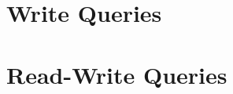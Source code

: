 


\section{Write Queries}
\label{sec:write-queries}




\section{Read-Write Queries}
\label{sec:rw-queries}



